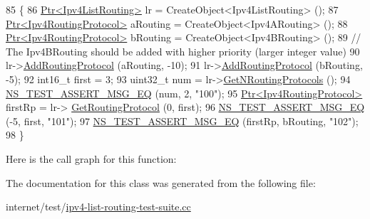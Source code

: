 \begin{DoxyCode}
85 \{
86   \hyperlink{classns3_1_1Ptr}{Ptr<Ipv4ListRouting>} lr = CreateObject<Ipv4ListRouting> ();
87   \hyperlink{classns3_1_1Ptr}{Ptr<Ipv4RoutingProtocol>} aRouting = CreateObject<Ipv4ARouting> ();
88   \hyperlink{classns3_1_1Ptr}{Ptr<Ipv4RoutingProtocol>} bRouting = CreateObject<Ipv4BRouting> ();
89   \textcolor{comment}{// The Ipv4BRouting should be added with higher priority (larger integer value)}
90   lr->\hyperlink{classns3_1_1Ipv4ListRouting_aac3d4da5db389114e7b980c6136f11a2}{AddRoutingProtocol} (aRouting, -10);
91   lr->\hyperlink{classns3_1_1Ipv4ListRouting_aac3d4da5db389114e7b980c6136f11a2}{AddRoutingProtocol} (bRouting, -5);
92   int16\_t first = 3;
93   uint32\_t num = lr->\hyperlink{classns3_1_1Ipv4ListRouting_ace90506497803859bebb5cbfa04b56ce}{GetNRoutingProtocols} ();
94   \hyperlink{group__testing_ga2a9d78cffb3db8e867c35fff0b698cf5}{NS\_TEST\_ASSERT\_MSG\_EQ} (num, 2, \textcolor{stringliteral}{"100"});
95   \hyperlink{classns3_1_1Ptr}{Ptr<Ipv4RoutingProtocol>} firstRp = lr->
      \hyperlink{classns3_1_1Ipv4ListRouting_a1c47488f8ed4775ff5c33add867652b9}{GetRoutingProtocol} (0, first);
96   \hyperlink{group__testing_ga2a9d78cffb3db8e867c35fff0b698cf5}{NS\_TEST\_ASSERT\_MSG\_EQ} (-5, first, \textcolor{stringliteral}{"101"});
97   \hyperlink{group__testing_ga2a9d78cffb3db8e867c35fff0b698cf5}{NS\_TEST\_ASSERT\_MSG\_EQ} (firstRp, bRouting, \textcolor{stringliteral}{"102"});
98 \}
\end{DoxyCode}


Here is the call graph for this function\+:




The documentation for this class was generated from the following file\+:\begin{DoxyCompactItemize}
\item 
internet/test/\hyperlink{ipv4-list-routing-test-suite_8cc}{ipv4-\/list-\/routing-\/test-\/suite.\+cc}\end{DoxyCompactItemize}
